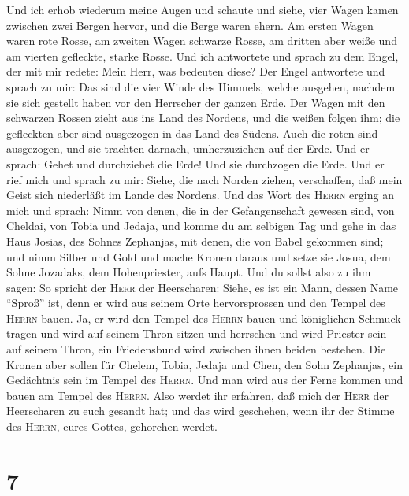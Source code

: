  Und ich erhob wiederum meine Augen und schaute und siehe,
vier Wagen kamen zwischen zwei Bergen hervor, und die Berge waren ehern.
 Am ersten Wagen waren rote Rosse, am zweiten Wagen
schwarze Rosse,  am dritten aber weiße und am vierten
gefleckte, starke Rosse.  Und ich antwortete und sprach zu
dem Engel, der mit mir redete: Mein Herr, was bedeuten diese?
 Der Engel antwortete und sprach zu mir: Das sind die vier
Winde des Himmels, welche ausgehen, nachdem sie sich gestellt haben vor
den Herrscher der ganzen Erde.  Der Wagen mit den
schwarzen Rossen zieht aus ins Land des Nordens, und die weißen folgen
ihm; die gefleckten aber sind ausgezogen in das Land des Südens.
 Auch die roten sind ausgezogen, und sie trachten darnach,
umherzuziehen auf der Erde. Und er sprach: Gehet und durchziehet die
Erde! Und sie durchzogen die Erde.  Und er rief mich und
sprach zu mir: Siehe, die nach Norden ziehen, verschaffen, daß mein
Geist sich niederläßt im Lande des Nordens.  Und das Wort
des \textsc{Herrn} erging an mich und sprach:  Nimm von
denen, die in der Gefangenschaft gewesen sind, von Cheldai, von Tobia
und Jedaja, und komme du am selbigen Tag und gehe in das Haus Josias,
des Sohnes Zephanjas, mit denen, die von Babel gekommen sind;
 und nimm Silber und Gold und mache Kronen daraus und
setze sie Josua, dem Sohne Jozadaks, dem Hohenpriester, aufs Haupt.
 Und du sollst also zu ihm sagen: So spricht der
\textsc{Herr} der Heerscharen: Siehe, es ist ein Mann, dessen Name
``Sproß'' ist, denn er wird aus seinem Orte hervorsprossen und den
Tempel des \textsc{Herrn} bauen.  Ja, er wird den Tempel
des \textsc{Herrn} bauen und königlichen Schmuck tragen und wird auf
seinem Thron sitzen und herrschen und wird Priester sein auf seinem
Thron, ein Friedensbund wird zwischen ihnen beiden bestehen.
 Die Kronen aber sollen für Chelem, Tobia, Jedaja und
Chen, den Sohn Zephanjas, ein Gedächtnis sein im Tempel des
\textsc{Herrn}.  Und man wird aus der Ferne kommen und
bauen am Tempel des \textsc{Herrn}. Also werdet ihr erfahren, daß mich
der \textsc{Herr} der Heerscharen zu euch gesandt hat; und das wird
geschehen, wenn ihr der Stimme des \textsc{Herrn}, eures Gottes,
gehorchen werdet.

\hypertarget{section-6}{%
\section{7}\label{section-6}}

